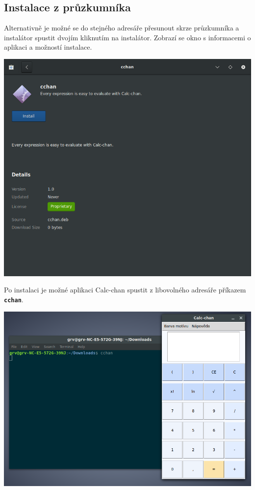 \documentclass[a4paper, 11pt]{article}
\begin{document}
\subsection{Instalace z průzkumníka}
\noindent Alternativně je možné se do stejného adresáře přesunout skrze průzkumníka a instalátor spustit dvojím kliknutím na instalátor. Zobrazí se okno s informacemi o aplikaci a možností instalace.\\
\begin{center}
\includegraphics[scale=0.60]{installmanager.png}\\
\end{center}
\newpage
\noindent Po instalaci je možné aplikaci Calc-chan spustit z libovolného adresáře příkazem \texttt{\textbf{cchan}}.\\
\begin{center}
\includegraphics[scale=0.5]{cchanrun}
\end{center}
\end{document}
